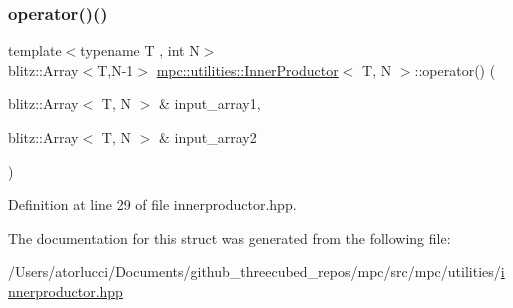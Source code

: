 \subsubsection{\texorpdfstring{operator()()}{operator()()}}
{\footnotesize\ttfamily template$<$typename T , int N$>$ \\
blitz\+::\+Array$<$T,N-\/1$>$ \mbox{\hyperlink{structmpc_1_1utilities_1_1_inner_productor}{mpc\+::utilities\+::\+Inner\+Productor}}$<$ T, N $>$\+::operator() (\begin{DoxyParamCaption}\item[{blitz\+::\+Array$<$ T, N $>$ \&}]{input\+\_\+array1,  }\item[{blitz\+::\+Array$<$ T, N $>$ \&}]{input\+\_\+array2 }\end{DoxyParamCaption})\hspace{0.3cm}{\ttfamily [inline]}}



Definition at line 29 of file innerproductor.\+hpp.



The documentation for this struct was generated from the following file\+:\begin{DoxyCompactItemize}
\item 
/\+Users/atorlucci/\+Documents/github\+\_\+threecubed\+\_\+repos/mpc/src/mpc/utilities/\mbox{\hyperlink{innerproductor_8hpp}{innerproductor.\+hpp}}\end{DoxyCompactItemize}
